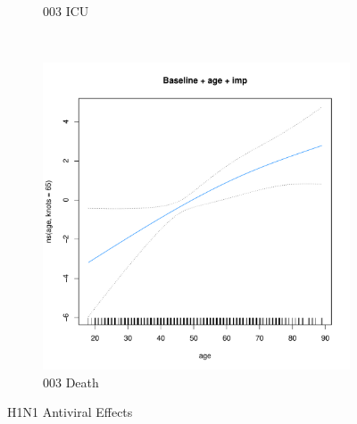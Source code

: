 \documentclass[12pt,twoside]{article}
\begin{document}
\begin{figure}[h]
{\begin{subfigure}{.49\linewidth}
                \caption{003 ICU}
        \end{subfigure}\\
        \begin{subfigure}{.49\linewidth}
                \includegraphics[width=\textwidth, page=4]{003Death_H1N1}
                \caption{003 Death}
        \end{subfigure}

        } 
        \caption{H1N1 Antiviral Effects}\label{reduced}

\par\bigskip
\par\bigskip
\par\bigskip
\par\bigskip


\end{figure}
\end{document}
